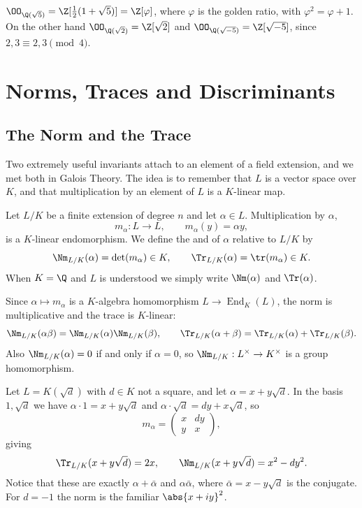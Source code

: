\begin{example}
	$\OO_{\Q(\sqrt 5)} = \Z[\tfrac12(1+\sqrt5)] = \Z[\varphi]$, where $\varphi$ is the golden ratio, with $\varphi^2 = \varphi + 1$. On the other hand $\OO_{\Q(\sqrt 2)} = \Z[\sqrt2]$ and $\OO_{\Q(\sqrt{-5})} = \Z[\sqrt{-5}]$, since $2, 3 \equiv 2, 3 \pmod 4$.
\end{example}

\section{Norms, Traces and Discriminants}\label{sec:normtrace}

\subsection{The Norm and the Trace}

Two extremely useful invariants attach to an element of a field extension, and we met both in Galois Theory. The idea is to remember that $L$ is a vector space over $K$, and that multiplication by an element of $L$ is a $K$-linear map.

\begin{definition}
	Let $L/K$ be a finite extension of degree $n$ and let $\alpha \in L$. Multiplication by $\alpha$,
	$$m_\alpha : L \to L, \qquad m_\alpha(y) = \alpha y,$$
	is a $K$-linear endomorphism. We define the  and  of $\alpha$ relative to $L/K$ by
	$$\Nm_{L/K}(\alpha) = \det(m_\alpha) \in K, \qquad \Tr_{L/K}(\alpha) = \tr(m_\alpha) \in K.$$
	When $K = \Q$ and $L$ is understood we simply write $\Nm(\alpha)$ and $\Tr(\alpha)$.
\end{definition}

Since $\alpha \mapsto m_\alpha$ is a $K$-algebra homomorphism $L \to \operatorname{End}_K(L)$, the norm is multiplicative and the trace is $K$-linear:
$$\Nm_{L/K}(\alpha\beta) = \Nm_{L/K}(\alpha)\Nm_{L/K}(\beta), \qquad \Tr_{L/K}(\alpha+\beta) = \Tr_{L/K}(\alpha) + \Tr_{L/K}(\beta).$$
Also $\Nm_{L/K}(\alpha) = 0$ if and only if $\alpha = 0$, so $\Nm_{L/K} : L^\times \to K^\times$ is a group homomorphism.

\begin{example}\label{ex:quadnormtrace}
	Let $L = K(\sqrt d)$ with $d \in K$ not a square, and let $\alpha = x + y\sqrt d$. In the basis $1, \sqrt d$ we have $\alpha \cdot 1 = x + y \sqrt d$ and $\alpha \cdot \sqrt d = dy + x\sqrt d$, so
	$$m_\alpha = \begin{pmatrix} x & dy \\ y & x\end{pmatrix},$$
	giving
	$$\Tr_{L/K}(x + y\sqrt d) = 2x, \qquad \Nm_{L/K}(x+y\sqrt d) = x^2 - dy^2.$$
	Notice that these are exactly $\alpha + \bar\alpha$ and $\alpha\bar\alpha$, where $\bar\alpha = x - y\sqrt d$ is the conjugate. For $d = -1$ the norm is the familiar $\abs{x+iy}^2$.
\end{example}

